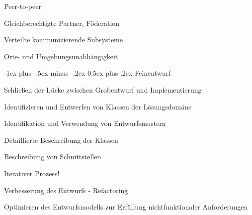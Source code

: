\documentclass[a4paper]{article}
\makeatletter
\renewcommand{\section}{\@startsection{section}{1}{0mm}%
                                {-1ex plus -.5ex minus -.2ex}%
                                {0.5ex plus .2ex}%
                                {\normalfont\large\bfseries}}
\makeatother
\begin{document}
\begin{multicols}{3}
Peer-to-peer
\begin{itemize*}
  \item Gleichberechtigte Partner, Föderation
  \item Verteilte kommunizierende Subsysteme
  \item Orts- und Umgebungsunabhängigkeit
\end{itemize*}


  \newpage
  \section{Feinentwurf}

  Schließen der Lücke zwischen Grobentwurf und Implementierung
  \begin{itemize*}
    \item Identifizieren und Entwerfen von Klassen der Lösungsdomäne
    \item Identifikation und Verwendung von Entwurfsmustern
    \item Detaillierte Beschreibung der Klassen
    \item Beschreibung von Schnittstellen
    \item Iterativer Prozess!
    \begin{itemize*}
      \item Verbesserung des Entwurfs - Refactoring
      \item Optimieren des Entwurfsmodells zur Erfüllung nichtfunktionaler Anforderungen
    \end{itemize*}
  \end{itemize*}


\end{multicols}
\end{document}
